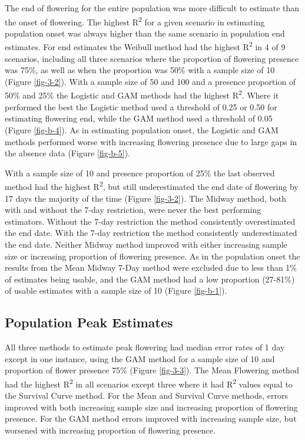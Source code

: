 The end of flowering for the entire population was more difficult to estimate than the onset of flowering. The highest R\textsuperscript{2} for a given scenario in estimating population onset was always higher than the same scenario in population end estimates. For end estimates the Weibull method had the highest R\textsuperscript{2} in 4 of 9 scenarios, including all three scenarios where the proportion of flowering presence was 75\%, as well as when the proportion was 50\% with a sample size of 10 (Figure \ref{fig-3-2}). With a sample size of 50 and 100 and a presence proportion of 50\% and 25\% the Logistic and GAM methods had the highest R\textsuperscript{2}. Where it performed the best the Logistic method used a threshold of 0.25 or 0.50 for estimating flowering end, while the GAM method used a threshold of 0.05 (Figure  \ref{fig-b-4}). As in estimating population onset, the Logistic and GAM methods performed worse with increasing flowering presence due to large gaps in the absence data (Figure \ref{fig-b-5}).

With a sample size of 10 and presence proportion of 25\% the last observed method had the highest R\textsuperscript{2}, but still underestimated the end date of flowering by 17 days the majority of the time (Figure \ref{fig-3-2}). The Midway method, both with and without the 7-day restriction, were never the best performing estimators. Without the 7-day restriction the method consistently overestimated the end date. With the 7-day restriction the method consistently underestimated the end date. Neither Midway method improved with either increasing sample size or increasing proportion of flowering presence. As in the population onset the results from the Mean Midway 7-Day method were excluded due to less than 1\% of estimates being usable, and the GAM method had a low proportion (27-81\%) of usable estimates with a sample size of 10 (Figure \ref{fig-b-1}).

\subsection{Population Peak Estimates}

All three methods to estimate peak flowering had median error rates of 1 day except in one instance, using the GAM method for a sample size of 10 and proportion of flower presence 75\% (Figure \ref{fig-3-3}). The Mean Flowering method had the highest R\textsuperscript{2} in all scenarios except three where it had R\textsuperscript{2} values equal to the Survival Curve method. For the Mean and Survival Curve methods, errors improved with both increasing sample size and increasing proportion of flowering presence. For the GAM method errors improved with increasing sample size, but worsened with increasing proportion of flowering presence. 

